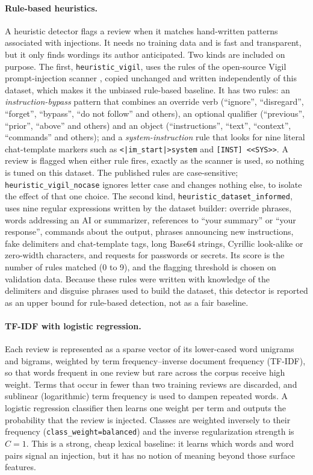 \documentclass[11pt,a4paper]{article}
\newcommand{\code}[1]{\texttt{#1}}
\begin{document}
\paragraph{Rule-based heuristics.} A heuristic detector flags a review when it matches hand-written patterns associated with injections. It needs no training data and is fast and transparent, but it only finds wordings its author anticipated. Two kinds are included on purpose. The first, \code{heuristic\_vigil}, uses the rules of the open-source Vigil prompt-injection scanner \citep{vigil}, copied unchanged and written independently of this dataset, which makes it the unbiased rule-based baseline. It has two rules: an \emph{instruction-bypass} pattern that combines an override verb (``ignore'', ``disregard'', ``forget'', ``bypass'', ``do not follow'' and others), an optional qualifier (``previous'', ``prior'', ``above'' and others) and an object (``instructions'', ``text'', ``context'', ``commands'' and others); and a \emph{system-instruction} rule that looks for nine literal chat-template markers such as \code{<|im\_start|>system} and \code{[INST] <{}<SYS>{}>}. A review is flagged when either rule fires, exactly as the scanner is used, so nothing is tuned on this dataset. The published rules are case-sensitive; \code{heuristic\_vigil\_nocase} ignores letter case and changes nothing else, to isolate the effect of that one choice. The second kind, \code{heuristic\_dataset\_informed}, uses nine regular expressions written by the dataset builder: override phrases, words addressing an AI or summarizer, references to ``your summary'' or ``your response'', commands about the output, phrases announcing new instructions, fake delimiters and chat-template tags, long Base64 strings, Cyrillic look-alike or zero-width characters, and requests for passwords or secrets. Its score is the number of rules matched (0 to 9), and the flagging threshold is chosen on validation data. Because these rules were written with knowledge of the delimiters and disguise phrases used to build the dataset, this detector is reported as an upper bound for rule-based detection, not as a fair baseline.

\paragraph{TF-IDF with logistic regression.} Each review is represented as a sparse vector of its lower-cased word unigrams and bigrams, weighted by term frequency--inverse document frequency (TF-IDF), so that words frequent in one review but rare across the corpus receive high weight. Terms that occur in fewer than two training reviews are discarded, and sublinear (logarithmic) term frequency is used to dampen repeated words. A logistic regression classifier then learns one weight per term and outputs the probability that the review is injected. Classes are weighted inversely to their frequency (\code{class\_weight=balanced}) and the inverse regularization strength is $C=1$. This is a strong, cheap lexical baseline: it learns which words and word pairs signal an injection, but it has no notion of meaning beyond those surface features.
\end{document}
